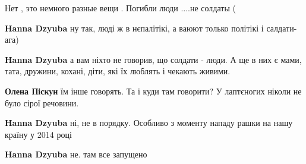 \begin{itemize}
\begin{itemize}
\begin{itemize}
 
Нет , это немного разные вещи . Погибли люди ....не солдаты (

 
\textbf{Hanna Dzyuba} ну так, люді ж в нєпалітікі, а ваюют только політікі і салдати- ага)

 
\textbf{Hanna Dzyuba} а вам ніхто не говорив, що солдати - люди. А ще в них є мами, тата, дружини, кохані, діти, які їх люблять і чекають живими.

 
\textbf{Олена Піскун} їм інше говорять. Та і куди там говорити? У лаптєногих ніколи не було сірої речовини.

 
\textbf{Hanna Dzyuba} ні, не в порядку. Особливо з моменту нападу рашки на нашу країну у 2014 році

 
\textbf{Hanna Dzyuba} не. там все запущено
\end{itemize}


\end{itemize}
\end{itemize}
